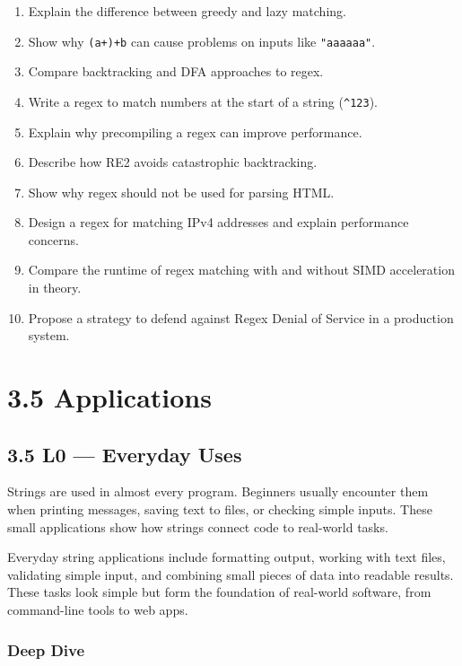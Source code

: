 \documentclass[
  letterpaper,
  DIV=11,
  numbers=noendperiod]{scrreprt}
\providecommand{\tightlist}{%
  \setlength{\itemsep}{0pt}\setlength{\parskip}{0pt}}
\begin{document}
\begin{enumerate}
\def\labelenumi{\arabic{enumi}.}
\tightlist
\item
  Explain the difference between greedy and lazy matching.
\item
  Show why \texttt{(a+)+b} can cause problems on inputs like
  \texttt{"aaaaaa"}.
\item
  Compare backtracking and DFA approaches to regex.
\item
  Write a regex to match numbers at the start of a string
  (\texttt{\^{}123}).
\item
  Explain why precompiling a regex can improve performance.
\item
  Describe how RE2 avoids catastrophic backtracking.
\item
  Show why regex should not be used for parsing HTML.
\item
  Design a regex for matching IPv4 addresses and explain performance
  concerns.
\item
  Compare the runtime of regex matching with and without SIMD
  acceleration in theory.
\item
  Propose a strategy to defend against Regex Denial of Service in a
  production system.
\end{enumerate}

\section{3.5 Applications}\label{applications}

\subsection{3.5 L0 --- Everyday Uses}\label{l0-everyday-uses}

Strings are used in almost every program. Beginners usually encounter
them when printing messages, saving text to files, or checking simple
inputs. These small applications show how strings connect code to
real-world tasks.

Everyday string applications include formatting output, working with
text files, validating simple input, and combining small pieces of data
into readable results. These tasks look simple but form the foundation
of real-world software, from command-line tools to web apps.

\subsubsection{Deep Dive}\label{deep-dive-34}
\end{document}
